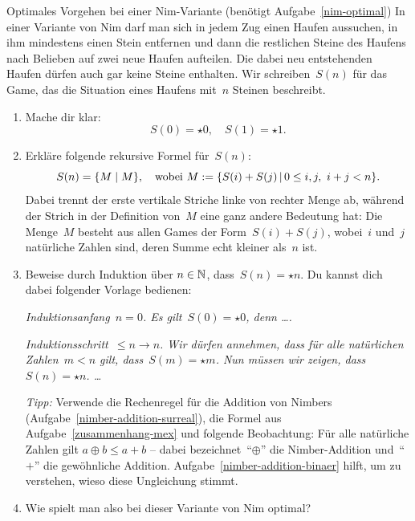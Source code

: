 \documentclass{zirkelblatt}
\begin{document}
\begin{aufgabe}{Optimales Vorgehen bei einer Nim-Variante
(benötigt Aufgabe~\ref{nim-optimal})}
In einer Variante von Nim darf man sich in jedem Zug einen Haufen aussuchen, in
ihm mindestens einen Stein entfernen und dann die restlichen Steine des Haufens
nach Belieben auf zwei neue Haufen aufteilen. Die dabei neu entstehenden Haufen
dürfen auch gar keine Steine enthalten. Wir schreiben~$S(n)$ für das Game, das
die Situation eines Haufens mit~$n$ Steinen beschreibt.
\begin{enumerate}
\item Mache dir klar:
\[ S(0) = \star0, \quad S(1) = \star1. \]
\item Erkläre folgende rekursive Formel für~$S(n)$:
\[ S(n) = \{ M \mathrel{|} M \}, \quad \text{wobei $M := \{ S(i) + S(j) \,|\, 0\leq i,j,\
i+j < n \}$}. \]
Dabei trennt der erste vertikale Striche linke von rechter Menge ab, während
der Strich in der Definition von~$M$ eine ganz andere Bedeutung hat: Die
Menge~$M$ besteht aus allen Games der Form~$S(i) + S(j)$, wobei~$i$ und~$j$
natürliche Zahlen sind, deren Summe echt kleiner als~$n$ ist.
\item Beweise durch Induktion über $n \in \mathbb{N}$, dass~$S(n) = \star n$. Du
kannst dich dabei folgender Vorlage bedienen:

\emph{Induktionsanfang~$n = 0$. Es gilt~$S(0) = \star 0$, denn \ldots.}

\emph{Induktionsschritt~$\leq n \to n$. Wir dürfen annehmen, dass für alle
natürlichen Zahlen~$m < n$ gilt, dass~$S(m) = \star m$. Nun müssen wir zeigen,
dass~$S(n) = \star n$. \ldots}

\emph{Tipp:} Verwende die Rechenregel für die Addition von Nimbers
(Aufgabe~\ref{nimber-addition-surreal}), die Formel aus
Aufgabe~\ref{zusammenhang-mex} und folgende Beobachtung: Für alle natürliche
Zahlen gilt $a \oplus b \leq a + b$ -- dabei bezeichnet~"`$\oplus$"' die
Nimber-Addition und~"`$+$"' die gewöhnliche Addition.
Aufgabe~\ref{nimber-addition-binaer} hilft, um zu verstehen, wieso diese
Ungleichung stimmt.
\item Wie spielt man also bei dieser Variante von Nim optimal?
\end{enumerate}
\end{aufgabe}


\loesungenfalse
\end{document}
